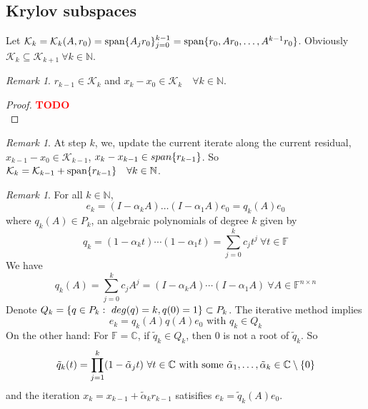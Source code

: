 \documentclass[12pt]{article}
\theoremstyle{definition}
\theoremstyle{remark}
\newtheorem{remark}[theorem]{Remark}
\numberwithin{equation}{section}
\newcommand{\F}{\mathbb{F}}
\newcommand{\C}{\mathbb{C}}
\newcommand{\N}{\mathbb{N}}
\newcommand{\TODO}[1][]{\textcolor{red}{\textbf{TODO\ifblank{#1}{}{:\ }#1}}\\}
\DeclarePairedDelimiter{\set}{\{}{\}}
\begin{document}
\subsection*{Krylov subspaces}
Let $\mathcal{K}_k = \mathcal{K}_k(A, r_0) = \textnormal{span}\set{A_j r_0}_{j=0}^{k-1} = \textnormal{span} \set{r_0, A r_0, \ldots, A^{k-1} r_0}$. Obviously $\mathcal{K}_k \subseteq \mathcal{K}_{k+1}\  \forall k \in \N$.
\begin{remark}
  $r_{k-1} \in \mathcal{K}_k$ and $x_k - x_0 \in \mathcal{K}_k \quad \forall k \in \N$.
\end{remark}
\begin{proof}
  \TODO
\end{proof}
\begin{remark}
  At step $k$, we, update the current iterate along the current residual, $x_{k-1} - x_0 \in \mathcal{K}_{k-1}$, $x_k - x_{k-1} \in \mathnormal{span}\set{r_{k-1}}$. So $\mathcal{K}_k = \mathcal{K}_{k-1} + \textnormal{span}\set{r_{k-1}} \quad \forall k \in \N$.
\end{remark}
\begin{remark}
  For all $k \in \N$,
  \begin{equation*}
    e_k = (I - \alpha_k A) \ldots (I - \alpha_1 A) e_0 = q_k(A)e_0
  \end{equation*}
  where $q_k(A) \in P_k$, an algebraic polynomials of degree $k$ given by
  \begin{equation*}
    q_k = (1 - \alpha_k t) \cdots (1 - \alpha_1 t) = \sum_{j=0}^k c_j t^j \ \forall t \in \F
  \end{equation*}
  We have
  \begin{equation*}
    q_k(A) = \sum_{j=0}^k c_j A^j = (I - \alpha_k A) \cdots (I - \alpha_1 A) \ \forall A \in \F^{n \times n}
  \end{equation*}
  Denote $Q_k = \set{q \in P_k:\ deg(q) = k, q(0) = 1} \subset P_k$. The iterative method implies
  \begin{equation*}
    e_k = q_k(A)q(A)e_0 \text{ with } q_k \in Q_k
  \end{equation*}
  On the other hand: For $\F = \C$, if $\tilde{q}_k \in Q_k$, then 0 is not a root of $\tilde{q}_k$. So
  \begin{equation*}
    \tilde{q}_k(t) = \prod_{j=1}^k (1 - \tilde{\alpha}_j t)\ \forall t \in \C \text{ with some } \tilde{\alpha}_1, \ldots, \tilde{\alpha}_k \in \C \setminus \set{0}
  \end{equation*}
  and the iteration $x_k = x_{k-1} + \tilde{\alpha}_k r_{k-1}$ satisifies $e_k = \tilde{q}_k(A)e_0$.
\end{remark}
\end{document}
